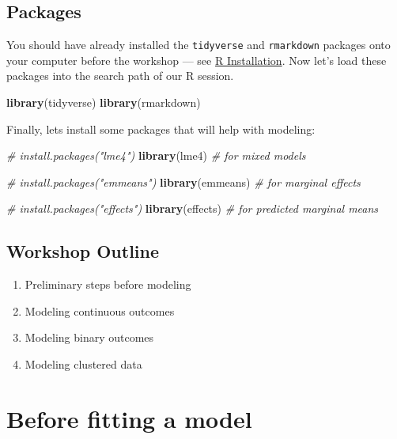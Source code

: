 \documentclass[]{book}
\newenvironment{Shaded}{\begin{snugshade}}{\end{snugshade}}
\newcommand{\CommentTok}[1]{\textcolor[rgb]{0.56,0.35,0.01}{\textit{#1}}}
\newcommand{\KeywordTok}[1]{\textcolor[rgb]{0.13,0.29,0.53}{\textbf{#1}}}
\newcommand{\NormalTok}[1]{#1}
\providecommand{\tightlist}{%
  \setlength{\itemsep}{0pt}\setlength{\parskip}{0pt}}
\begin{document}
\hypertarget{packages}{%
\subsection{Packages}\label{packages}}

You should have already installed the \texttt{tidyverse} and \texttt{rmarkdown}
packages onto your computer before the workshop
--- see \href{./Rinstall.html}{R Installation}.
Now let's load these packages into the search path of our R session.

\begin{Shaded}
\begin{Highlighting}[]
\KeywordTok{library}\NormalTok{(tidyverse)}
\KeywordTok{library}\NormalTok{(rmarkdown)}
\end{Highlighting}
\end{Shaded}

Finally, lets install some packages that will help with modeling:

\begin{Shaded}
\begin{Highlighting}[]
\CommentTok{# install.packages("lme4")}
\KeywordTok{library}\NormalTok{(lme4)  }\CommentTok{# for mixed models}

\CommentTok{# install.packages("emmeans")}
\KeywordTok{library}\NormalTok{(emmeans)  }\CommentTok{# for marginal effects}

\CommentTok{# install.packages("effects")}
\KeywordTok{library}\NormalTok{(effects)  }\CommentTok{# for predicted marginal means}
\end{Highlighting}
\end{Shaded}

\hypertarget{workshop-outline}{%
\subsection{Workshop Outline}\label{workshop-outline}}

\begin{enumerate}
\def\labelenumi{\arabic{enumi}.}
\tightlist
\item
  Preliminary steps before modeling
\item
  Modeling continuous outcomes
\item
  Modeling binary outcomes
\item
  Modeling clustered data
\end{enumerate}

\hypertarget{before-fitting-a-model}{%
\section{Before fitting a model}\label{before-fitting-a-model}}
\end{document}
